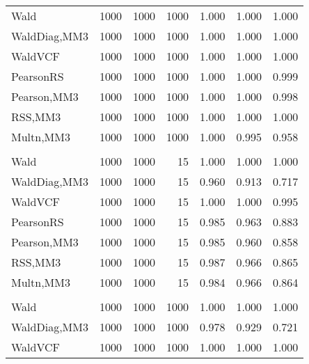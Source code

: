 \documentclass[
]{article}
\begin{document}
\begin{table}[H]
{\begin{tabular}[t]{lrrrrrr}
\hspace{1em}Wald & 1000 & 1000 & 1000 & 1.000 & 1.000 & \vphantom{1} 1.000\\
\hspace{1em}WaldDiag,MM3 & 1000 & 1000 & 1000 & 1.000 & 1.000 & 1.000\\
\hspace{1em}WaldVCF & 1000 & 1000 & 1000 & 1.000 & 1.000 & \vphantom{1} 1.000\\
\hspace{1em}PearsonRS & 1000 & 1000 & 1000 & 1.000 & 1.000 & 0.999\\
\hspace{1em}Pearson,MM3 & 1000 & 1000 & 1000 & 1.000 & 1.000 & 0.998\\
\hspace{1em}RSS,MM3 & 1000 & 1000 & 1000 & 1.000 & 1.000 & 1.000\\
\hspace{1em}Multn,MM3 & 1000 & 1000 & 1000 & 1.000 & 0.995 & 0.958\\
\addlinespace[0.3em]
\multicolumn{7}{l}{\textbf{2F 10V}}\\
\hspace{1em}Wald & 1000 & 1000 & 15 & 1.000 & 1.000 & 1.000\\
\hspace{1em}WaldDiag,MM3 & 1000 & 1000 & 15 & 0.960 & 0.913 & 0.717\\
\hspace{1em}WaldVCF & 1000 & 1000 & 15 & 1.000 & 1.000 & 0.995\\
\hspace{1em}PearsonRS & 1000 & 1000 & 15 & 0.985 & 0.963 & 0.883\\
\hspace{1em}Pearson,MM3 & 1000 & 1000 & 15 & 0.985 & 0.960 & 0.858\\
\hspace{1em}RSS,MM3 & 1000 & 1000 & 15 & 0.987 & 0.966 & 0.865\\
\hspace{1em}Multn,MM3 & 1000 & 1000 & 15 & 0.984 & 0.966 & 0.864\\
\addlinespace[0.3em]
\multicolumn{7}{l}{\textbf{3F 15V}}\\
\hspace{1em}Wald & 1000 & 1000 & 1000 & 1.000 & 1.000 & 1.000\\
\hspace{1em}WaldDiag,MM3 & 1000 & 1000 & 1000 & 0.978 & 0.929 & 0.721\\
\hspace{1em}WaldVCF & 1000 & 1000 & 1000 & 1.000 & 1.000 & 1.000\\

\end{tabular}}
\end{table}
\end{document}
